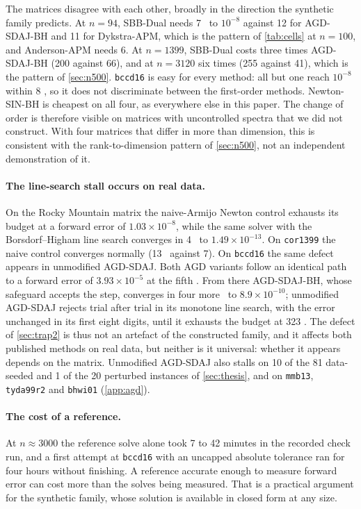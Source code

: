 The matrices disagree with each other, broadly in the direction the
synthetic family predicts. At $n=94$, SBB-Dual needs 7 \EVDs\ to $10^{-8}$
against 12 for AGD-SDAJ-BH and 11 for Dykstra-APM, which is the pattern of
\cref{tab:cells} at $n=100$, and Anderson-APM needs 6. At
$n=1399$, SBB-Dual costs three times AGD-SDAJ-BH (200 against 66), and at
$n=3120$ six times (255 against 41), which is the pattern of \cref{sec:n500}.
\texttt{bccd16} is easy for every method: all but one reach $10^{-8}$ within
8 \EVDs, so it does not discriminate between the first-order methods.
Newton-SIN-BH is cheapest on all four, as everywhere else in this paper. The
change of order is therefore visible on matrices with uncontrolled spectra that
we did not construct. With four matrices that differ in more than dimension,
this is consistent with the rank-to-dimension pattern of \cref{sec:n500}, not an
independent demonstration of it.

\paragraph{The line-search stall occurs on real data.}
On the Rocky Mountain matrix the naive-Armijo Newton control exhausts its
budget at a forward error of $1.03\times10^{-8}$, while the same solver with
the Borsdorf--Higham line search converges in 4 \EVDs\ to
$1.49\times10^{-13}$. On \texttt{cor1399} the naive control converges normally
(13 \EVDs\ against 7). On \texttt{bccd16} the same defect appears in
unmodified AGD-SDAJ. Both AGD variants follow an identical path to a forward
error of $3.93\times10^{-5}$ at the fifth \EVD. From there AGD-SDAJ-BH, whose
safeguard accepts the step, converges in four more \EVDs\ to
$8.9\times10^{-10}$; unmodified AGD-SDAJ rejects trial after trial in its
monotone line search, with the error unchanged in its first eight digits, until
it exhausts the budget at 323 \EVDs. The defect of \cref{sec:trap2} is thus not
an artefact of the constructed family, and it affects both published methods on
real data, but neither is it universal: whether it appears depends on the
matrix. Unmodified AGD-SDAJ also stalls on 10 of the 81 data-seeded and 1 of
the 20 perturbed instances of \cref{sec:thesis}, and on \texttt{mmb13},
\texttt{tyda99r2} and \texttt{bhwi01} (\cref{app:agd}).

\paragraph{The cost of a reference.}
At $n\approx3000$ the reference solve alone took 7 to 42 minutes in the
recorded check run, and a first
attempt at \texttt{bccd16} with an uncapped absolute tolerance ran for four
hours without finishing. A reference accurate enough to measure forward error
can cost more than the solves being measured. That is a practical argument for
the synthetic family, whose solution is available in closed form at any size.

